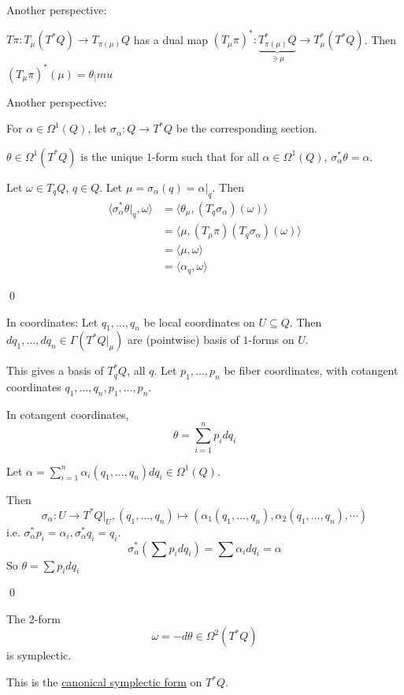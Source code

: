 \documentclass[x11names,reqno,14pt]{extarticle}
\begin{document}
Another perspective: 

$T\pi:T_\mu(T^*Q) \to T_{\pi(\mu)}Q$ has a dual map $(T_\mu\pi)^*:\underbrace{T_{\pi(\mu)}^*Q}_{\ni\mu}\to T_{\mu}^*(T^*Q)$. Then $(T_\mu\pi)^*(\mu) = \theta_|mu$

Another perspective:

For $\alpha\in\Omega^1(Q)$, let $\sigma_\alpha:Q\to T^*Q$ be the corresponding section. 

\prop

$\theta\in\Omega^1(T^*Q)$ is the unique $1$-form such that for all $\alpha\in\Omega^1(Q)$, $\sigma_\alpha^*\theta = \alpha$. 

\proof

Let $\omega\in T_qQ$, $q \in Q$. Let $\mu = \sigma_\alpha(q) = \alpha|_q$. Then
\begin{align*}
\langle\sigma_\alpha^*\theta|_q, \omega \rangle & = \langle \theta_\mu, (T_q\sigma_\alpha)(\omega)\rangle \\
& = \langle \mu, (T_\mu\pi)(T_q\sigma_\alpha)(\omega)\rangle \\
& = \langle \mu, \omega \rangle \\
& = \langle \alpha_q, \omega \rangle
\end{align*}

\qed

In coordinates: Let $q_1, \dots, q_n$ be local coordinates on $U \subseteq Q$. Then $dq_1, \dots, dq_n \in \Gamma(T^*Q|_\mu)$ are (pointwise) basis of $1$-forms on $U$. 

This gives a basis of $T_q^*Q$, all $q$. Let $p_1, \dots, p_n$ be fiber coordinates, with cotangent coordinates $q_1, \dots, q_n, p_1, \dots, p_n$. 

\lem

In cotangent coordinates, 
\[
\theta =\sum_{i=1}^np_idq_i
\]

\proof

Let $\alpha = \sum_{i=1}^n \alpha_i(q_1,\dots,q_n)dq_i \in \Omega^1(Q)$. 

Then 
\[
\sigma_\alpha:U\to T^*Q|_U, (q_1, \dots, q_n) \mapsto (\alpha_1(q_1, \dots, q_n), \alpha_2(q_1,\dots,q_n),\cdots)
\]
i.e. $\sigma_\alpha^*p_i = \alpha_i, \sigma_\alpha^*q_i = q_i$.
\[
\sigma_\alpha^*(\sum p_idq_i) = \sum \alpha_idq_i = \alpha
\]
So $\theta = \sum p_idq_i$

\qed

\thm

The 2-form
\[
\omega = -d\theta \in \Omega^2(T^*Q)
\]
is symplectic. 

This is the \underline{canonical symplectic form} on $T^*Q$. 
\end{document}
